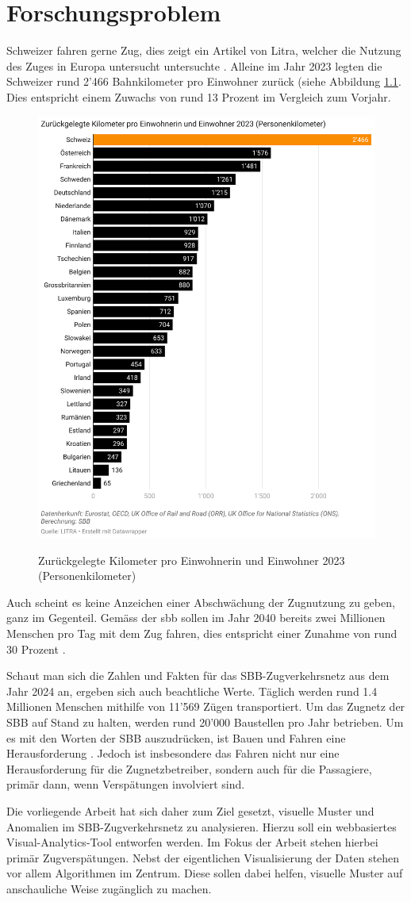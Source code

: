 \chapter{Forschungsproblem}
\label{kap:forschungsproblem_forschungsziel}
Schweizer fahren gerne Zug, dies zeigt ein Artikel von Litra, welcher die Nutzung des Zuges in Europa untersucht untersuchte \parencite{litra_bahnfahrtstatistik_europa_2023}. Alleine im Jahr 2023 legten die Schweizer rund 2'466 Bahnkilometer pro Einwohner zurück (siehe Abbildung \ref{fig_schweizer_fahren_zug}. Dies entspricht einem Zuwachs von rund 13 Prozent im Vergleich zum Vorjahr. 

\begin{figure}[H]
    \caption{Zurückgelegte Kilometer pro Einwohnerin und Einwohner 2023 (Personenkilometer) \parencite{litra_bahnfahrtstatistik_europa_2023}}
    \includegraphics[width=.4\linewidth]{content/00_assets/schweizer_fahren_zug.png}
    \label{fig_schweizer_fahren_zug}
\end{figure}

Auch scheint es keine Anzeichen einer Abschwächung der Zugnutzung zu geben, ganz im Gegenteil. Gemäss der \acrfull{sbb} sollen im Jahr 2040 bereits zwei Millionen Menschen pro Tag mit dem Zug fahren, dies entspricht einer Zunahme von rund 30 Prozent \parencite{sbb_ausbauschritt_2025}.

Schaut man sich die Zahlen und Fakten für das SBB-Zugverkehrsnetz aus dem Jahr 2024 an, ergeben sich auch beachtliche Werte. Täglich werden rund 1.4 Millionen Menschen mithilfe von 11'569 Zügen transportiert. Um das Zugnetz der SBB auf Stand zu halten, werden rund 20'000 Baustellen pro Jahr betrieben. Um es mit den Worten der SBB auszudrücken, ist Bauen und Fahren eine Herausforderung \parencite[S.8 - 9]{sbb_geschäftsbericht_2024}. Jedoch ist insbesondere das Fahren nicht nur eine Herausforderung für die Zugnetzbetreiber, sondern auch für die Passagiere, primär dann, wenn Verspätungen involviert sind.

Die vorliegende Arbeit hat sich daher zum Ziel gesetzt, visuelle Muster und Anomalien im SBB-Zugverkehrsnetz zu analysieren. Hierzu soll ein webbasiertes Visual-Analytics-Tool entworfen werden. Im Fokus der Arbeit stehen hierbei primär Zugverspätungen. Nebst der eigentlichen Visualisierung der Daten stehen vor allem Algorithmen im Zentrum. Diese sollen dabei helfen, visuelle Muster auf anschauliche Weise zugänglich zu machen.

